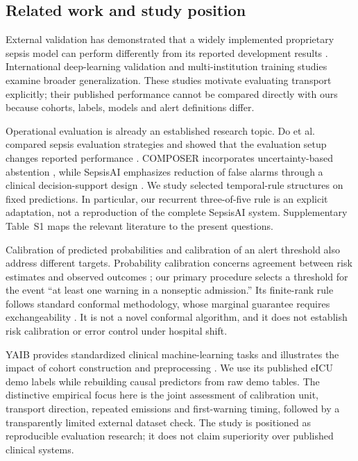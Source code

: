 \documentclass[preprint,12pt]{elsarticle}
\begin{document}
\subsection{Related work and study position}
External validation has demonstrated that a widely implemented proprietary sepsis model can perform differently from its reported development results \cite{wong}. International deep-learning validation \cite{moor} and multi-institution training studies \cite{rockenschaub} examine broader generalization. These studies motivate evaluating transport explicitly; their published performance cannot be compared directly with ours because cohorts, labels, models and alert definitions differ.

Operational evaluation is already an established research topic. Do et al. compared sepsis evaluation strategies and showed that the evaluation setup changes reported performance \cite{do}. COMPOSER incorporates uncertainty-based abstention \cite{composer}, while SepsisAI emphasizes reduction of false alarms through a clinical decision-support design \cite{gupta}. We study selected temporal-rule structures on fixed predictions. In particular, our recurrent three-of-five rule is an explicit adaptation, not a reproduction of the complete SepsisAI system. Supplementary Table~S1 maps the relevant literature to the present questions.

Calibration of predicted probabilities and calibration of an alert threshold also address different targets. Probability calibration concerns agreement between risk estimates and observed outcomes \cite{vancalster}; our primary procedure selects a threshold for the event ``at least one warning in a nonseptic admission.'' Its finite-rank rule follows standard conformal methodology, whose marginal guarantee requires exchangeability \cite{angelopoulos}. It is not a novel conformal algorithm, and it does not establish risk calibration or error control under hospital shift.

YAIB provides standardized clinical machine-learning tasks and illustrates the impact of cohort construction and preprocessing \cite{yaib}. We use its published eICU demo labels while rebuilding causal predictors from raw demo tables. The distinctive empirical focus here is the joint assessment of calibration unit, transport direction, repeated emissions and first-warning timing, followed by a transparently limited external dataset check. The study is positioned as reproducible evaluation research; it does not claim superiority over published clinical systems.
\end{document}
